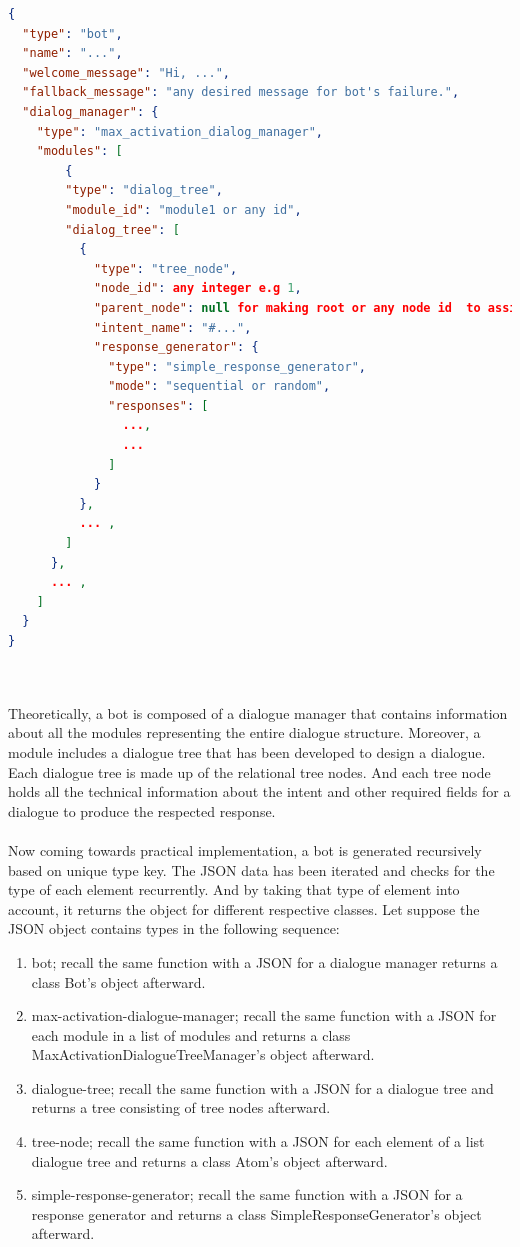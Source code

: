 \begin{minipage}{\linewidth}
\begin{lstlisting}[language=JSON, firstnumber=1, caption=Frankenbot's JSON Structure., label={lst:botJson}]
{
  "type": "bot",
  "name": "...",
  "welcome_message": "Hi, ...",
  "fallback_message": "any desired message for bot's failure.",
  "dialog_manager": {
    "type": "max_activation_dialog_manager",
    "modules": [
        {
        "type": "dialog_tree",
        "module_id": "module1 or any id",
        "dialog_tree": [
          {
            "type": "tree_node",
            "node_id": any integer e.g 1,
            "parent_node": null for making root or any node id  to assign it a parent,
            "intent_name": "#...",
            "response_generator": {
              "type": "simple_response_generator",
              "mode": "sequential or random",
              "responses": [
                ...,
                ...
              ]
            }
          },
          ... ,
        ]
      },
      ... ,
    ]
  }
}
\end{lstlisting}
\end{minipage}
\\~\\
Theoretically, a bot is composed of a dialogue manager that contains information about all the modules representing the entire dialogue structure. Moreover, a module includes a dialogue tree that has been developed to design a dialogue. Each dialogue tree is made up of the relational tree nodes. And each tree node holds all the technical information about the intent and other required fields for a dialogue to produce the respected response.
\\~\\
Now coming towards practical implementation, a bot is generated recursively based on unique type key. The JSON data has been iterated and checks for the type of each element recurrently. And by taking that type of element into account, it returns the object for different respective classes. Let suppose the JSON object contains types in the following sequence:
\begin{enumerate}
    \item bot; recall the same function with a JSON for a dialogue manager returns a class Bot's object afterward.
    \item max-activation-dialogue-manager; recall the same function with a JSON for each module in a list of modules and returns a class MaxActivationDialogueTreeManager's object afterward.
    \item dialogue-tree; recall the same function with a JSON for a dialogue tree and returns a tree consisting of tree nodes afterward.
     \item tree-node; recall the same function with a JSON for each element of a list dialogue tree and returns a class Atom's object afterward.
     \item simple-response-generator; recall the same function with a JSON for a response generator and returns a class SimpleResponseGenerator's object afterward.
\end{enumerate} 
